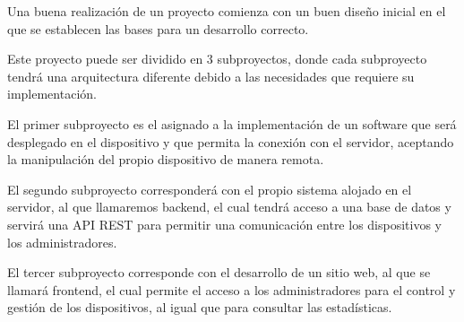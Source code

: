 Una buena realización de un proyecto comienza con un buen diseño inicial en el que se establecen las bases para un desarrollo correcto.

Este proyecto puede ser dividido en 3 subproyectos, donde cada subproyecto tendrá una arquitectura diferente debido a las necesidades que requiere su implementación.

El primer subproyecto es el asignado a la implementación de un software que será desplegado en el dispositivo y que permita la conexión con el servidor, aceptando la manipulación del propio dispositivo de manera remota.

El segundo subproyecto corresponderá con el propio sistema alojado en el servidor, al que llamaremos backend, el cual tendrá acceso a una base de datos y servirá una API REST para permitir una comunicación entre los dispositivos y los administradores.

El tercer subproyecto corresponde con el desarrollo de un sitio web, al que se llamará frontend, el cual permite el acceso a los administradores para el control y gestión de los dispositivos, al igual que para consultar las estadísticas.